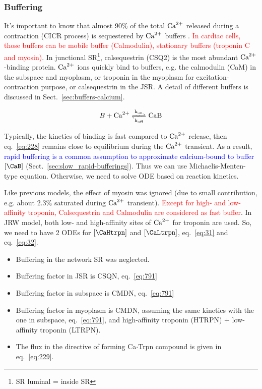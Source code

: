 \subsubsection{Buffering}
\label{sec:buffering-1}


It's important to know that almost 90\% of the total ${\text{Ca}^{2+}}$
released during a contraction (CICR process) is sequestered by
${\text{Ca}^{2+}}$ buffers \citep{berlin1994iccb}.
\textcolor{red}{ In cardiac cells, those buffers can be mobile buffer
  (Calmodulin), stationary buffers (troponin C and myosin)}.
In junctional SR\footnote{SR luminal = inside SR}, calsequestrin (CSQ2) is
the most abundant ${\text{Ca}^{2+}}$-binding protein.  ${\text{Ca}^{2+}}$ ions quickly
bind to buffers, e.g. the calmodulin (CaM) in the subspace and myoplasm, or
troponin in the myoplasm for excitation-contraction purpose, or
calsequestrin in the JSR. A detail of different buffers is discussed
in Sect.~\ref{sec:buffers-calcium}.


\begin{equation}
  \label{eq:228}
  B + \ce{Ca^2+ <=>[k_{on}][k_{off}] CaB}
\end{equation}

Typically, the kinetics of binding is fast compared to ${\text{Ca}^{2+}}$ release, then
eq.~\eqref{eq:228} remains close to equilibrium during the ${\text{Ca}^{2+}}$ transient. As a
result, \textcolor{blue}{rapid buffering is a common assumption to approximate
 calcium-bound to buffer} $[\CaB]$ (Sect.~\ref{sec:slow_rapid-bufferings}). Thus
 we can use Michaelis-Menten-type equation. Otherwise, we need to solve ODE
 based on reaction kinetics.


Like previous models, the effect of myosin was ignored (due to small
contribution, e.g. about 2.3\% saturated during ${\text{Ca}^{2+}}$
transient). \textcolor{red}{Except for high- and low-affinity troponin,
  Calsequestrin and Calmodulin are considered as fast buffer}.
In JRW model, both low- and high-affinity sites of
${\text{Ca}^{2+}}$ for troponin are used.  So, we need to have 2 ODEs for $[\CaHtrpn]$ and
$[\CaLtrpn]$, eq.~\eqref{eq:31} and eq.~\eqref{eq:32}.

\begin{itemize}
\item Buffering in the network SR was neglected.

\item Buffering factor in JSR is CSQN, eq.~\eqref{eq:791}
\item Buffering factor in subspace is CMDN, eq.~\eqref{eq:791}
\item Buffering factor in myoplasm is CMDN, assuming the same kinetics
  with the one in subspace, eq.~\eqref{eq:791}, and high-affinity
  troponin (HTRPN) + low-affinity troponin (LTRPN).

\item The flux in the directive of forming Ca$\cdot$Trpn compound is
  given in eq.~\eqref{eq:229}.
\end{itemize}

